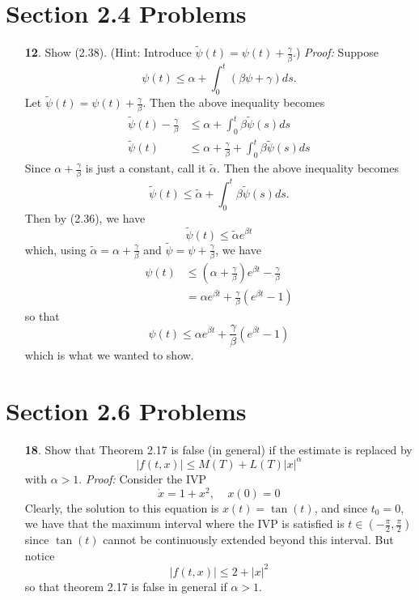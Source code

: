 \documentclass{article}
\begin{document}
\section*{Section 2.4 Problems}
\begin{itemize}
    \item[\textbf{12}.]  Show (2.38). (Hint: Introduce $\tilde{\psi}(t) = \psi(t) + \frac{\gamma}{\beta}$.)
    \newline\newline
    \textit{Proof:} Suppose 
    \[\psi(t) \leq \alpha + \int_0^t (\beta \psi + \gamma) ds.\] 
    Let $\tilde{\psi}(t) = \psi(t) + \frac{\gamma}{\beta}$. Then the above inequality becomes
    \begin{align*}
        \tilde{\psi}(t) - \frac{\gamma}{\beta} &\leq \alpha + \int_0^t \beta \tilde{\psi}(s)ds\\
        \tilde{\psi}(t) &\leq \alpha + \frac{\gamma}{\beta} + \int_0^t \beta \tilde{\psi}(s)ds
    \end{align*}
    Since $\alpha + \tfrac{\gamma}{\beta}$ is just a constant, call it $\tilde{\alpha}$. Then the above inequality becomes
    \[\tilde{\psi}(t) \leq \tilde{\alpha} + \int_0^t \beta \tilde{\psi}(s)ds.\]
    Then by (2.36), we have
    \[\tilde{\psi}(t) \leq \tilde{\alpha}e^{\beta t}\]
    which, using $\tilde{\alpha} = \alpha + \tfrac{\gamma}{\beta}$ and $\tilde{\psi} = \psi + \tfrac{\gamma}{\beta}$, we have
    \begin{align*}
        \psi(t) &\leq \left(\alpha + \frac{\gamma}{\beta}\right)e^{\beta t} - \frac{\gamma}{\beta}\\
        &= \alpha e^{\beta t} + \frac{\gamma}{\beta}(e^{\beta t} - 1)
    \end{align*}
    so that
    \[\psi(t) \leq \alpha e^{\beta t} + \frac{\gamma}{\beta}(e^{\beta t} - 1)\]
    which is what we wanted to show.
\end{itemize}

\section*{Section 2.6 Problems}
\begin{itemize}
    \item[\textbf{18}.] Show that Theorem 2.17 is false (in general) if the estimate is replaced by
    \[|f(t,x)| \leq M(T) + L(T)|x|^{\alpha}\]
    with $\alpha > 1$.
    \newline\newline
    \textit{Proof:} Consider the IVP 
    \[\dot{x} = 1 + x^2, \:\:\:\:\: x(0) = 0\]
    Clearly, the solution to this equation is $x(t) = \tan(t)$, and since $t_0 = 0$, we have that the maximum interval where the IVP is satisfied is $t \in \left(-\tfrac{\pi}{2}, \tfrac{\pi}{2}\right)$ since $\tan(t)$ cannot be continuously extended beyond this interval. But notice
    \[|f(t,x)| \leq 2 + |x|^2\]
    so that theorem 2.17 is false in general if $\alpha > 1$.
\end{itemize}
\end{document}
